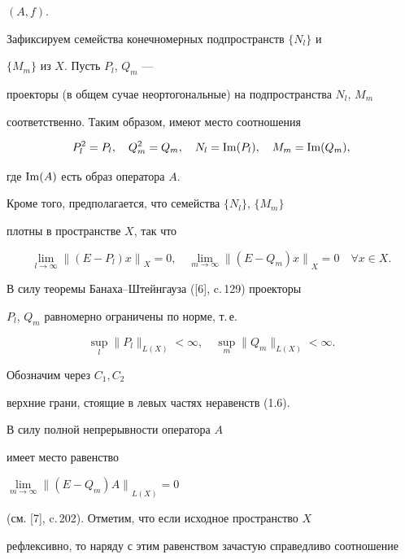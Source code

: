 $(A,f)$.





Зафиксируем семейства конечномерных подпространств $\{N_l\}$ и


$\{M_m\}$ из $X$. Пусть $P_l$, $Q_m$ --- 


проекторы (в общем сучае неортогональные) на подпространства $N_l$, $M_m$


соответственно. Таким образом, имеют место соотношения


$$


P_l^2=P_l, \quad Q_m^2=Q_m, \quad N_l= \im (P_l), \quad M_m= \im (Q_m),


$$


где $\operatorname{Im} (A)$ есть образ оператора $A$.


Кроме того, предполагается, что семейства $\{N_l\}$, $\{M_m\}$


плотны в пространстве $X$, так что


$$


\lim \limits_{l \to \infty} {\| (E- P_l)x \|}_X =0, \quad


\lim \limits_{m \to \infty} {\| (E- Q_m)x \|}_X =0 \quad


\forall x \in X.


$$


В силу теоремы Банаха--Штейнгауза ([6], c.\,129) проекторы


$P_l$, $Q_m$ равномерно ограничены по норме, т.\,е.


\begin{equation}


\sup \limits_l \| P_l \|_{ L(X)} < \infty, \quad


\sup \limits_m \| Q_m \|_{ L(X)} < \infty.


\tag{1.6}


\end{equation}


Обозначим через $C_1, C_2$


верхние грани, стоящие в левых частях неравенств (1.6).


В силу полной непрерывности оператора $A$


имеет место равенство


$\lim \limits_{m \to \infty} {\| (E- Q_m)A \|}_{ L(X)} =0$


(см. [7], c.\,202). Отметим, что если исходное пространство $X$


рефлексивно, то наряду с этим равенством зачастую справедливо соотношение


